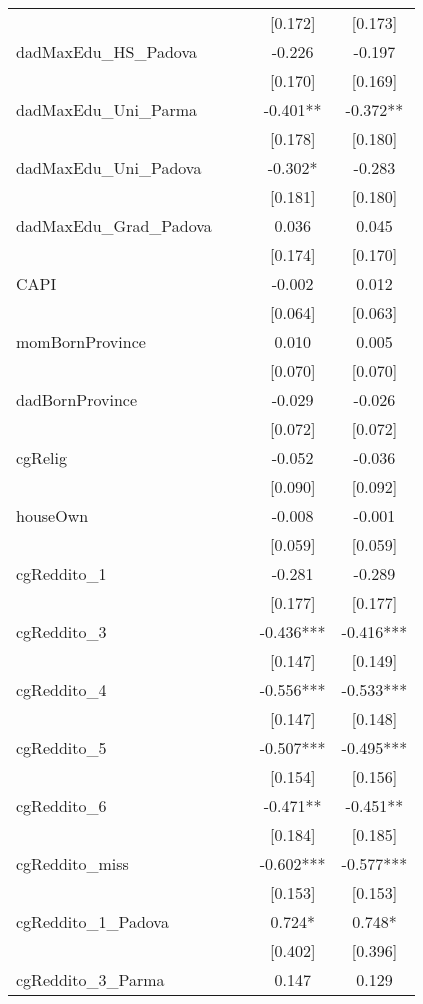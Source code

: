 \documentclass[]{article}
\begin{document}
\begin{tabular}{lcccc}
 &  &  & [0.172] & [0.173] \\
dadMaxEdu\_HS\_Padova &  &  & -0.226 & -0.197 \\
 &  &  & [0.170] & [0.169] \\
dadMaxEdu\_Uni\_Parma &  &  & -0.401** & -0.372** \\
 &  &  & [0.178] & [0.180] \\
dadMaxEdu\_Uni\_Padova &  &  & -0.302* & -0.283 \\
 &  &  & [0.181] & [0.180] \\
dadMaxEdu\_Grad\_Padova &  &  & 0.036 & 0.045 \\
 &  &  & [0.174] & [0.170] \\
CAPI &  &  & -0.002 & 0.012 \\
 &  &  & [0.064] & [0.063] \\
momBornProvince &  &  & 0.010 & 0.005 \\
 &  &  & [0.070] & [0.070] \\
dadBornProvince &  &  & -0.029 & -0.026 \\
 &  &  & [0.072] & [0.072] \\
cgRelig &  &  & -0.052 & -0.036 \\
 &  &  & [0.090] & [0.092] \\
houseOwn &  &  & -0.008 & -0.001 \\
 &  &  & [0.059] & [0.059] \\
cgReddito\_1 &  &  & -0.281 & -0.289 \\
 &  &  & [0.177] & [0.177] \\
cgReddito\_3 &  &  & -0.436*** & -0.416*** \\
 &  &  & [0.147] & [0.149] \\
cgReddito\_4 &  &  & -0.556*** & -0.533*** \\
 &  &  & [0.147] & [0.148] \\
cgReddito\_5 &  &  & -0.507*** & -0.495*** \\
 &  &  & [0.154] & [0.156] \\
cgReddito\_6 &  &  & -0.471** & -0.451** \\
 &  &  & [0.184] & [0.185] \\
cgReddito\_miss &  &  & -0.602*** & -0.577*** \\
 &  &  & [0.153] & [0.153] \\
cgReddito\_1\_Padova &  &  & 0.724* & 0.748* \\
 &  &  & [0.402] & [0.396] \\
cgReddito\_3\_Parma &  &  & 0.147 & 0.129 \\

\end{tabular}
\end{document}
